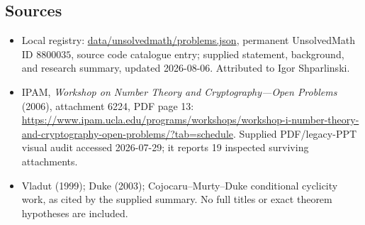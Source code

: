 \documentclass[11pt]{article}
\begin{document}
\subsection{Sources}
\begin{itemize}
\item Local registry: \url{data/unsolvedmath/problems.json}, permanent UnsolvedMath ID \(8800035\), source code catalogue entry; supplied statement, background, and research summary, updated 2026-08-06. Attributed to Igor Shparlinski.
\item IPAM, \emph{Workshop on Number Theory and Cryptography---Open Problems} (2006), attachment 6224, PDF page 13: \url{https://www.ipam.ucla.edu/programs/workshops/workshop-i-number-theory-and-cryptography-open-problems/?tab=schedule}. Supplied PDF/legacy-PPT visual audit accessed 2026-07-29; it reports 19 inspected surviving attachments.
\item Vladut (1999); Duke (2003); Cojocaru--Murty--Duke conditional cyclicity work, as cited by the supplied summary. No full titles or exact theorem hypotheses are included.
\end{itemize}
\end{document}
